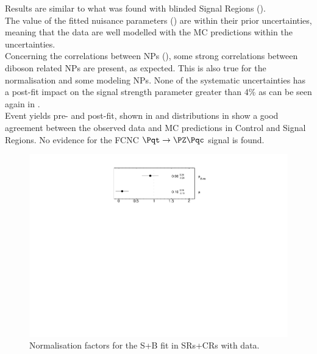 Results are similar to what was found with blinded Signal Regions ().\\
The value of the fitted nuisance parameters () are within their prior uncertainties,
meaning that the data are well modelled with the MC predictions within the uncertainties.\\
Concerning the correlations between NPs
(), some strong correlations
between diboson related NPs are present, as expected. This is also
true for the \ttbar normalisation and some \ttbar modeling NPs. 
None of the systematic uncertainties has a post-fit impact on the signal strength parameter greater than 4\% as can be seen again in .\\
Event yields pre- and post-fit, shown in  and distributions in  show a good agreement between the observed data and MC predictions in Control and Signal Regions. No evidence for the FCNC $\mathrm{\Pqt\rightarrow\PZ\Pqc}$ signal is found.

\begin{figure}[htbp]
	\centering
	\includegraphics[width=.5\textwidth]{Chapters/CH8/figures/SPLUSB_CRSR_DL1rc_unblind/NormFactors}
	\caption{Normalisation factors for the S+B \tZc fit in SRs+CRs with data.}%
	\label{fig:stat:tzc:splusb:crsr:norm_unb}
\end{figure}

